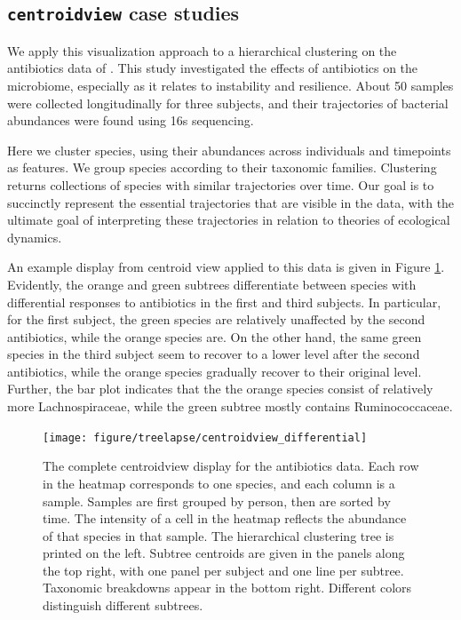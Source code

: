 \subsection{\texttt{centroidview} case studies}

We apply this visualization approach to a hierarchical clustering on the
antibiotics data of \cite{dethlefsen2011incomplete}. This study investigated the
effects of antibiotics on the microbiome, especially as it relates to
instability and resilience. About 50 samples were collected longitudinally for
three subjects, and their trajectories of bacterial abundances were found using
16s sequencing.

Here we cluster species, using their abundances across individuals and
timepoints as features. We group species according to their taxonomic families.
Clustering returns collections of species with similar trajectories over time.
Our goal is to succinctly represent the essential trajectories that are visible
in the data, with the ultimate goal of interpreting these trajectories in
relation to theories of ecological dynamics.

An example display from centroid view applied to this data is given in Figure
\ref{fig:centroidview_differential}. Evidently, the orange and green subtrees
differentiate between species with differential responses to antibiotics in the
first and third subjects. In particular, for the first subject, the green
species are relatively unaffected by the second antibiotics, while the orange
species are. On the other hand, the same green species in the third subject seem
to recover to a lower level after the second antibiotics, while the orange
species gradually recover to their original level. Further, the bar plot
indicates that the the orange species consist of relatively more
Lachnospiraceae, while the green subtree mostly contains Ruminococcaceae.

\begin{figure}
  \centering
  \texttt{[image: figure/treelapse/centroidview\_differential]}
  \caption{
    The complete centroidview display for the antibiotics data. Each row in the
    heatmap corresponds to one species, and each column is a sample. Samples are
    first grouped by person, then are sorted by time. The intensity of a cell in
    the heatmap reflects the abundance of that species in that sample. The
    hierarchical clustering tree is printed on the left. Subtree centroids are
    given in the panels along the top right, with one panel per subject and one
    line per subtree. Taxonomic breakdowns appear in the bottom right. Different
    colors distinguish different subtrees.
    \label{fig:centroidview_differential}
  }
\end{figure}

